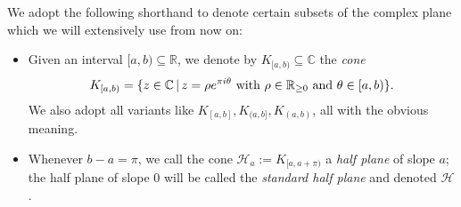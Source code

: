 \begin{notat}\label{half.planes}
We adopt the following shorthand to denote certain subsets of the complex plane which we will extensively use from now on:
\index{.Kab@$K_{[a,b)}$}
\begin{itemize}
\item Given an interval $[a,b)\subseteq \mathbb{R}$, we denote by $K_{[a,b)}\subseteq \mathbb{C}$ the \emph{cone}
\[
K_{[a,b)}=\{z\in\mathbb{C}\,|\, z=\rho e^{\pi i \theta} \text{ with } \rho\in \mathbb{R}_{\geq 0} \text{ and } \theta\in [a,b)\}.
\]
We also adopt all variants like $K_{[a,b]}, K_{(a,b]}, K_{(a,b)}$, all with the obvious meaning.
\item Whenever $b-a = \pi$, we call the cone $\mathcal{H}_a := K_{[a,a+\pi)}$ a \emph{half plane} of slope $a$; the half plane of slope $0$ will be called the \emph{standard half plane} and denoted $\mathcal{H}$.
\end{itemize}
\end{notat}


